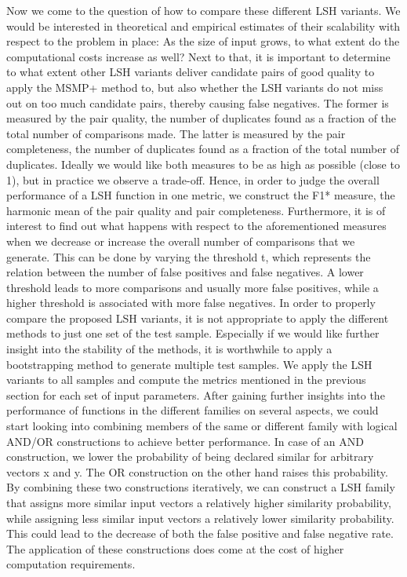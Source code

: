 Now we come to the question of how to compare these different LSH variants. We would be interested in theoretical and empirical estimates of their scalability with respect to the problem in place: As the size of input grows, to what extent do the computational costs increase as well? Next to that, it is important to determine to what extent other LSH variants deliver candidate pairs of good quality to apply the  MSMP+ method to, but also whether the LSH variants do not miss out on too much candidate pairs, thereby causing false negatives. The former is measured by the pair quality, the number of duplicates found as a fraction of the total number of comparisons made. The latter is measured by the pair completeness, the number of duplicates found as a fraction of the total number of duplicates. Ideally we would like both measures to be as high as possible (close to 1), but in practice we observe a trade-off. Hence, in order to judge the overall performance of a LSH function in one metric, we construct the F1* measure, the harmonic mean of the pair quality and pair completeness. Furthermore, it is of interest to find out what happens with respect to the aforementioned measures when we decrease or increase the overall number of comparisons that we generate. This can be done by varying the threshold t, which represents the relation between the number of false positives and false negatives. A lower threshold leads to more comparisons and usually more false positives, while a higher threshold is associated with more false negatives. 
In order to properly compare the proposed LSH variants, it is not appropriate to apply the different methods to just one set of the test sample. Especially if we would like further insight into the stability of the methods, it is worthwhile to apply a bootstrapping method to generate multiple test samples. We apply the LSH variants to all samples and compute the metrics mentioned in the previous section for each set of input parameters.
After gaining further insights into the performance of functions in the different families on several aspects, we could start looking into combining members of the same or different family with logical AND/OR constructions to achieve better performance. In case of an AND construction, we lower the probability of being declared similar for arbitrary vectors x and y. The OR construction on the other hand raises this probability. By combining these two constructions iteratively, we can construct a LSH family that assigns more similar input vectors a relatively higher similarity probability, while assigning less similar input vectors a relatively lower similarity probability. This could lead to the decrease of both the false positive and false negative rate. The application of these constructions does come at the cost of higher computation requirements.